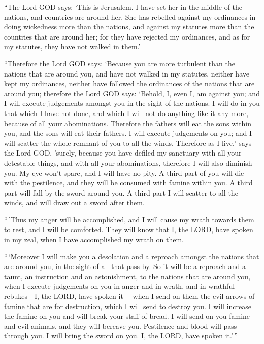  ``The Lord GOD says: `This is Jerusalem. I have set her
in the middle of the nations, and countries are around her.
 She has rebelled against my ordinances in doing
wickedness more than the nations, and against my statutes more than the
countries that are around her; for they have rejected my ordinances, and
as for my statutes, they have not walked in them.'

 ``Therefore the Lord GOD says: `Because you are more
turbulent than the nations that are around you, and have not walked in
my statutes, neither have kept my ordinances, neither have followed the
ordinances of the nations that are around you;  therefore
the Lord GOD says: `Behold, I, even I, am against you; and I will
execute judgements amongst you in the sight of the nations.
 I will do in you that which I have not done, and which I
will not do anything like it any more, because of all your abominations.
 Therefore the fathers will eat the sons within you, and
the sons will eat their fathers. I will execute judgements on you; and I
will scatter the whole remnant of you to all the winds. 
Therefore as I live,' says the Lord GOD, 'surely, because you have
defiled my sanctuary with all your detestable things, and with all your
abominations, therefore I will also diminish you. My eye won't spare,
and I will have no pity.  A third part of you will die
with the pestilence, and they will be consumed with famine within you. A
third part will fall by the sword around you. A third part I will
scatter to all the winds, and will draw out a sword after them.

 ``\,'Thus my anger will be accomplished, and I will
cause my wrath towards them to rest, and I will be comforted. They will
know that I, the LORD, have spoken in my zeal, when I have accomplished
my wrath on them.

 ``\,`Moreover I will make you a desolation and a
reproach amongst the nations that are around you, in the sight of all
that pass by.  So it will be a reproach and a taunt, an
instruction and an astonishment, to the nations that are around you,
when I execute judgements on you in anger and in wrath, and in wrathful
rebukes---I, the LORD, have spoken it---  when I send on
them the evil arrows of famine that are for destruction, which I will
send to destroy you. I will increase the famine on you and will break
your staff of bread.  I will send on you famine and evil
animals, and they will bereave you. Pestilence and blood will pass
through you. I will bring the sword on you. I, the LORD, have spoken
it.'\,''

